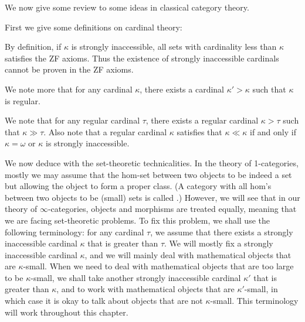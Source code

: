 \label{secc}

We now give some review to some ideas in classical category theory. 

First we give some definitions on cardinal theory:


By definition, if $\kappa$ is strongly inaccessible, all sets with cardinality less than $\kappa$ satisfies the ZF axioms.
Thus the existence of strongly inaccessible cardinals cannot be proven in the ZF axioms.

We note more that for any cardinal $\kappa$, there exists a cardinal $\kappa'>\kappa$ such that $\kappa$ is regular.


We note that for any regular cardinal $\tau$, there exists a regular cardinal $\kappa>\tau$ such that $\kappa\gg\tau$.
Also note that a regular cardinal $\kappa$ satisfies that $\kappa\ll\kappa$ if and only if $\kappa=\omega$
or $\kappa$ is strongly inaccessible.

We now deduce with the set-theoretic technicalities. In the theory of 1-categories, mostly we may assume that 
the hom-set between two objects to be indeed a set but allowing the object to form a proper class.
(A category with all hom's between two objects to be (small) sets is called .) However,
we will see that in our theory of $\infty$-categories, objects and morphisms are treated equally,
meaning that we are facing set-theoretic problems. To fix this problem, we shall use the following terminology:
for any cardinal $\tau$, we assume that there exists a strongly inaccessible cardinal
$\kappa$ that is greater than $\tau$. We will mostly fix a strongly inaccessible cardinal $\kappa$, and we will mainly deal with
mathematical objects that are $\kappa$-small. When we need to deal with mathematical objects that are too large to be
$\kappa$-small, we shall take another strongly inaccessible cardinal $\kappa'$ that is greater than $\kappa$, and to work
with mathematical objects that are $\kappa'$-small, in which case it is okay to talk about objects that are not $\kappa$-small.
This terminology will work throughout this chapter.


